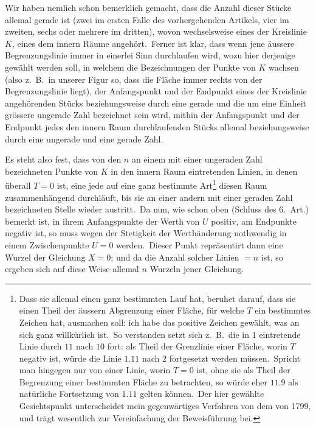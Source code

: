 \documentclass[12pt,a4paper]{article}
\theoremstyle{plain}
\begin{document}
Wir haben nemlich schon bemerklich gemacht, dass die Anzahl dieser Stücke
allemal gerade ist (zwei im ersten Falle des vorhergehenden Artikels, vier im
zweiten, sechs oder mehrere im dritten), wovon wechselsweise eines der Kreislinie
$K$, eines dem innern Räume angehört.\ Ferner ist klar, dass wenn jene äussere
Begrenzungslinie immer in einerlei Sinn durchlaufen wird, wozu hier derjenige
gewählt werden soll, in welchem die Bezeichnungen der Punkte von $K$ wachsen
(also z.\ B.\ in unserer Figur so, dass die Fläche immer rechts von der
Begrenzungslinie liegt), der Anfangspunkt und der Endpunkt eines der Kreislinie
angehörenden Stücks beziehungsweise durch eine gerade und die um eine Einheit
grössere ungerade Zahl bezeichnet sein wird, mithin der Anfangspunkt und der
Endpunkt jedes den innern Raum durchlaufenden Stücks allemal beziehungsweise
durch eine ungerade und eine gerade Zahl.

Es steht also fest, dass von den $n$ an einem mit einer ungeraden Zahl bezeichneten Punkte von $K$ in den innern Raum eintretenden Linien, in denen
überall $T = 0$ ist, eine jede auf eine ganz bestimmte Art\footnote{Dass sie allemal einen ganz bestimmten Lauf hat, beruhet darauf, dass sie einen Theil der äussern
Abgrenzung einer Fläche, für welche $T$ ein bestimmtes Zeichen hat, ausmachen soll: ich habe das positive
Zeichen gewählt, was an sich ganz willkürlich ist.\ So verstanden setzt sich z.\ B.\ die in $1$ eintretende Linie
durch $11$ nach $10$ fort: als Theil der Grenzlinie einer Fläche, worin $T$ negativ ist, würde die Linie $1.11$
nach $2$ fortgesetzt werden müssen.\ Spricht man hingegen nur von einer Linie, worin $T = 0$ ist, ohne sie als
Theil der Begrenzung einer bestimmten Fläche zu betrachten, so würde eher $11.9$ als natürliche Fortsetzung
von $1.11$ gelten können.\ Der hier gewählte Gesichtspunkt unterscheidet mein gegenwärtiges Verfahren von
dem von 1799, und trägt wesentlich zur Vereinfachung der Beweisführung bei.} diesen
Raum zusammenhängend durchläuft, bis sie an einer andern mit einer geraden Zahl bezeichneten Stelle wieder austritt.\ Da nun, wie schon oben (Schluss des 6.\ Art.) bemerkt
ist, in ihrem Anfangspunkte der Werth von $U$ positiv, am Endpunkte negativ
ist, so muss wegen der Stetigkeit der Werthänderung nothwendig in einem Zwischenpunkte $U = 0$ werden.\ Dieser Punkt repräsentirt dann eine Wurzel der
Gleichung $X = 0$; und da die Anzahl solcher Linien $= n$ ist, so ergeben sich
auf diese Weise allemal $n$ Wurzeln jener Gleichung.
\end{document}
